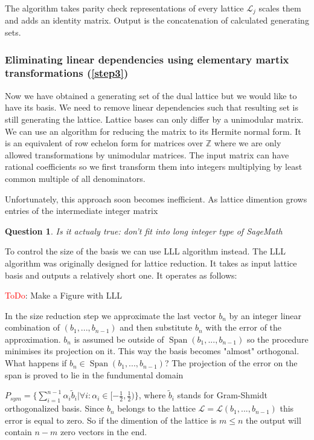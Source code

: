 \documentclass[12pt]{article}
\newcommand{\ZZ}{\mathbb{Z}}
\newcommand{\LL}{\mathcal{L}}
\DeclareMathOperator{\Span}{Span}
\newtheorem{question}{Question}
\begin{document}
The algorithm takes parity check representations of every lattice $\LL_{j}$ scales them and adds an identity matrix. Output is the concatenation of calculated generating sets.

\subsubsection{Eliminating linear dependencies using elementary martix transformations (\ref{step3})}

Now we have obtained a generating set of the dual lattice but we would like to have its basis. We need to remove linear dependencies such that resulting set is still generating the lattice. Lattice bases can only differ by a unimodular matrix. We can use an algorithm for reducing the matrix to its Hermite normal form. It is an equivalent of row echelon form for matrices over $\ZZ$ where we are only allowed transformations by unimodular matrices. The input matrix can have rational coefficients so we first transform them into integers multiplying by least common multiple of all denominators.

Unfortunately, this approach soon becomes inefficient. As lattice dimention grows entries of the intermediate integer matrix

\begin{question}
    Is it actualy true: don't fit into long integer type of SageMath
\end{question}

To control the size of the basis we can use LLL algorithm instead. The LLL algorithm was originally designed for lattice reduction. It takes as input lattice basis and outputs a relatively short one. It operates as follows:

\textcolor{red}{ToDo}: Make a Figure with LLL

In the size reduction step we approximate the last vector $b_{n}$ by an integer linear combination of $(b_{1}, ..., b_{n-1})$ and then substitute $b_{n}$ with the error of the approximation. $b_{n}$ is assumed be outside of $\Span(b_{1}, ..., b_{n-1})$ so the procedure minimises its projection on it. This way the basis becomes "almost" orthogonal. What happens if $b_{n} \in \Span(b_{1}, ..., b_{n-1})$? The projection of the error on the span is proved to lie in the fundumental domain

$P_{sym} = \{ \sum_{i = 1}^{n-1}\alpha_{i}\tilde{b}_{i}| \forall i: \alpha_{i} \in [-\frac{1}{2}, \frac{1}{2})\}$, where $\tilde{b}_{i}$ stands for Gram-Shmidt orthogonalized basis. Since $b_{n}$ belongs to the lattice $\LL = \LL(b_{1}, ..., b_{n-1})$
this error is equal to zero. So if the dimention of the lattice is $m \leq n$ the output will contain $n-m$ zero vectors in the end.
\end{document}
